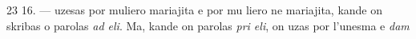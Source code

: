 \begin{VUpage}[27]{23}
16. ---  uzesas por muliero mariajita e por mu\cc
liero ne mariajita, kande on skribas o parolas \textit{ad eli}. Ma,\nl
kande on parolas \textit{pri eli}, on uzas  por l'unesma e \textit{dam}\cc
\parplein
\end{VUpage}

